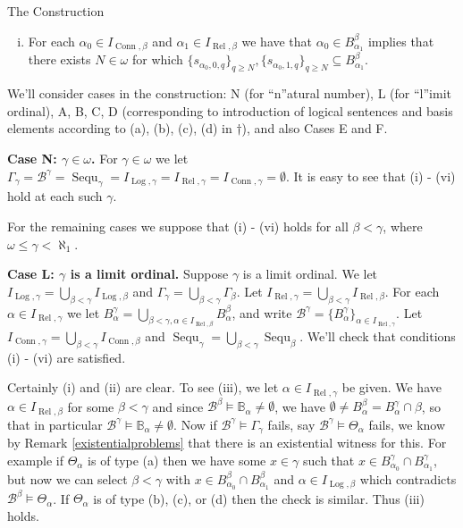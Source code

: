 \documentclass{amsart}
\theoremstyle{definition}\newtheorem{theorem}{Theorem}
\theoremstyle{definition}\newtheorem{bigtheorem}{Theorem}
\numberwithin{theorem}{section}
\theoremstyle{definition}\newtheorem{corollary}[theorem]{Corollary}
\theoremstyle{definition}\newtheorem{proposition}[theorem]{Proposition}
\theoremstyle{definition}\newtheorem{definition}[theorem]{Definition}
\theoremstyle{definition}\newtheorem{question}[theorem]{Question}
\theoremstyle{definition}\newtheorem{example}[theorem]{Example}
\theoremstyle{definition}\newtheorem{remark}[theorem]{Remark}
\theoremstyle{definition}\newtheorem{note}[theorem]{Note}
\theoremstyle{definition}\newtheorem{lemma}[theorem]{Lemma}
\theoremstyle{definition}\newtheorem{fact}[theorem]{Fact}
\theoremstyle{definition}\newtheorem{define}[theorem]{Definition}
\theoremstyle{definition}\newtheorem{definitions}[theorem]{Definitions}
\theoremstyle{definition}\newtheorem{claim}[theorem]{Claim}
\theoremstyle{definition}\newtheorem{obs}[theorem]{Observation}
\theoremstyle{definition}\newtheorem{construction}[theorem]{Construction}
\newcommand{\B}{\mathbb{B}}
\newcommand{\Rel}{\operatorname{Rel}}
\newcommand{\Log}{\operatorname{Log}}
\newcommand{\Conn}{\operatorname{Conn}}
\newcommand{\Bo}{\mathcal{B}}
\newcommand{\Sequ}{\operatorname{Sequ}}
\begin{document}
\begin{section}{The Construction}
\begin{enumerate}[(i)]
\item For each $\alpha_0 \in I_{\Conn, \beta}$ and $\alpha_1 \in I_{\Rel, \beta}$ we have that $\alpha_0 \in B_{\alpha_1}^{\beta}$ implies that there exists $N \in \omega$ for which $\{s_{\alpha_0, 0, q}\}_{q \geq N}, \{s_{\alpha_0, 1, q}\}_{q \geq N} \subseteq B_{\alpha_1}^{\beta}$.

\end{enumerate}

We'll consider cases in the construction: N (for ``n''atural number), L (for ``l''imit ordinal), A, B, C, D (corresponding to introduction of logical sentences and basis elements according to (a), (b), (c), (d) in $\dagger$), and also Cases E and F.


\noindent \textbf{Case N: $\gamma \in \omega$.}  For $\gamma \in \omega$ we let $\Gamma_{\gamma} = \Bo^{\gamma} = \Sequ_{\gamma} = I_{\Log, \gamma} = I_{\Rel, \gamma} = I_{\Conn, \gamma} = \emptyset$.  It is easy to see that (i) - (vi) hold at each such $\gamma$.


For the remaining cases we suppose that (i) - (vi) holds for all $\beta <\gamma$, where $\omega \leq \gamma <\aleph_1$.


\noindent \textbf{Case L: $\gamma$ is a limit ordinal.}  Suppose $\gamma$ is a limit ordinal.  We let $I_{\Log, \gamma} = \bigcup_{\beta < \gamma} I_{\Log, \beta}$ and $\Gamma_{\gamma} = \bigcup_{\beta < \gamma} \Gamma_{\beta}$.  Let $I_{\Rel, \gamma} = \bigcup_{\beta <\gamma}  I_{\Rel, \beta}$.  For each $\alpha \in I_{\Rel, \gamma}$ we let $B_{\alpha}^{\gamma} = \bigcup_{\beta < \gamma, \alpha \in I_{\Rel, \beta}} B_{\alpha}^{\beta}$, and write $\Bo^{\gamma} = \{B_{\alpha}^{\gamma}\}_{\alpha \in I_{\Rel, \gamma}}$.  Let $I_{\Conn, \gamma} = \bigcup_{\beta < \gamma} I_{\Conn, \beta}$ and $\Sequ_{\gamma} = \bigcup_{\beta < \gamma} \Sequ_{\beta}$.  We'll check that conditions (i) - (vi) are satisfied.

Certainly (i) and (ii) are clear.  To see (iii), we let $\alpha \in I_{\Rel, \gamma}$ be given.  We have $\alpha \in I_{\Rel, \beta}$ for some $\beta < \gamma$ and since $\Bo^{\beta} \models \B_{\alpha} \neq \emptyset$, we have $\emptyset \neq B_{\alpha}^{\beta} = B_{\alpha}^{\gamma}\cap \beta$, so that in particular $\Bo^{\gamma}\models \B_{\alpha} \neq \emptyset$.  Now if $\Bo^{\gamma} \models \Gamma_{\gamma}$ fails, say $\Bo^{\gamma} \models \Theta_{\alpha}$ fails, we know by Remark \ref{existentialproblems} that there is an existential witness for this.  For example if $\Theta_{\alpha}$ is of type (a) then we have some $x\in \gamma$ such that $x\in B_{\alpha_0}^{\gamma} \cap B_{\alpha_1}^{\gamma}$, but now we can select $\beta < \gamma$ with $x\in B_{\alpha_0}^{\beta} \cap B_{\alpha_1}^{\beta}$ and $\alpha \in I_{\Log, \beta}$ which contradicts $\Bo^{\beta} \models \Theta_{\alpha}$.  If $\Theta_{\alpha}$ is of type (b), (c), or (d) then the check is similar.  Thus (iii) holds.


\end{section}
\end{document}
